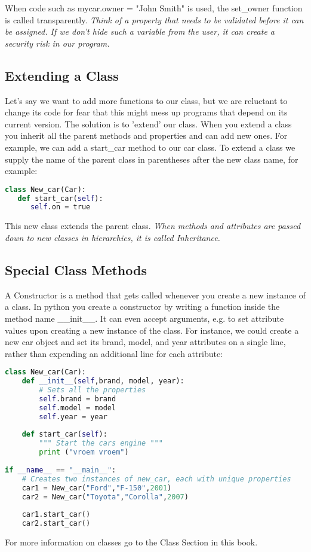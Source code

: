 When code such as mycar.owner = "John Smith" is used, the set\_owner function is
called transparently.
\textit{Think of a property that needs to be validated before it can be
assigned. If we don't hide such a variable from the user, it can create a
security risk in our program.}

\subsection{Extending a Class}
Let's say we want to add more functions to our class, but we are reluctant to
change its code for fear that this might mess up programs that depend on its
current version. The solution is to 'extend' our class. When you extend a class
you inherit all the parent methods and properties and can add new ones. For
example, we can add a start\_car method to our car class. To extend a class we
supply the name of the parent class in parentheses after the new class name, for
example:
\lstset{basicstyle=\scriptsize, numbers=left, captionpos=b, tabsize=4}
\begin{lstlisting}[caption=Extending Classes,language={Python},
xleftmargin=15pt, label=lst:extendingclasses]
class New_car(Car):
   def start_car(self):
      self.on = true
\end{lstlisting}

This new class extends the parent class.
\textit{When methods and attributes are passed down to new classes in
hierarchies, it is called Inheritance.}

\subsection{Special Class Methods}
A Constructor is a method that gets called whenever you create a new instance of
a class. In python you create a constructor by writing a function inside the
method name \_\_init\_\_. It can even accept arguments, e.g. to set attribute values
upon creating a new instance of the class. For instance, we could create a new
car object and set its brand, model, and year attributes on a single line,
rather than expending an additional line for each attribute:
\lstset{basicstyle=\scriptsize, numbers=left, captionpos=b, tabsize=4}
\begin{lstlisting}[caption=Constructor,language={Python},
xleftmargin=15pt, label=lst:constructor]
class New_car(Car):
    def __init__(self,brand, model, year):
        # Sets all the properties
        self.brand = brand
        self.model = model
        self.year = year
 
    def start_car(self):
        """ Start the cars engine """
        print ("vroem vroem")
 
if __name__ == "__main__":
    # Creates two instances of new_car, each with unique properties
    car1 = New_car("Ford","F-150",2001)
    car2 = New_car("Toyota","Corolla",2007)
 
    car1.start_car()
    car2.start_car()
\end{lstlisting}

For more information on classes go to the Class Section in this book.

